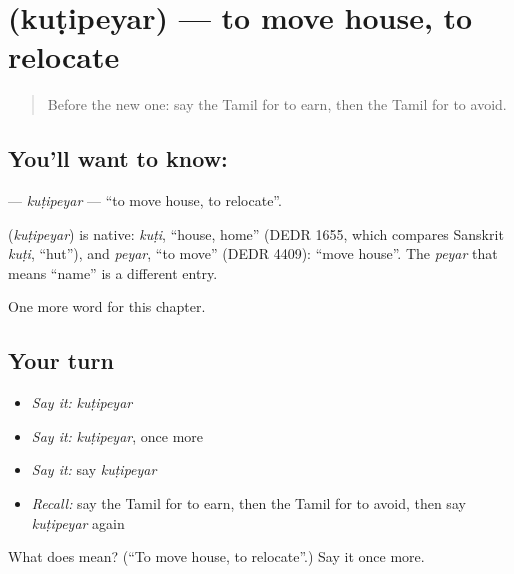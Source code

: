 \section[\texorpdfstring{\ta{குடிபெயர்} (kuṭipeyar)}{குடிபெயர் (kuṭipeyar)}]{ (kuṭipeyar) — to move house, to relocate}

\label{lesson:TA-C197-kutipeyar}



\begin{quote}
Before the new one: say the Tamil for to earn, then the Tamil for to avoid.
\end{quote}

\subsection*{You'll want to know: }
\textbf{} — \emph{kuṭipeyar} — \textquotedblleft{}to move house, to relocate\textquotedblright{}.

\begin{cousinweb}
\textbf{} (\emph{kuṭipeyar}) is native: \emph{kuṭi}, \textquotedblleft{}house, home\textquotedblright{} (DEDR 1655, which compares Sanskrit \emph{kuṭi}, \textquotedblleft{}hut\textquotedblright{}), and \emph{peyar}, \textquotedblleft{}to move\textquotedblright{} (DEDR 4409): \textquotedblleft{}move house\textquotedblright{}. The \emph{peyar} that means \textquotedblleft{}name\textquotedblright{} is a different entry.
\end{cousinweb}

\begin{grammarlens}[title={What you've built}]
One more word for this chapter.
\end{grammarlens}

\subsection*{Your turn}
\begin{itemize}
\raggedright
  \item \emph{Say it:} \emph{kuṭipeyar}
  \item \emph{Say it:} \emph{kuṭipeyar}, once more
  \item \emph{Say it:} say \emph{kuṭipeyar}
  \item \emph{Recall:} say the Tamil for to earn, then the Tamil for to avoid, then say \emph{kuṭipeyar} again
\end{itemize}

\begin{tcolorbox}[breakable,colback=teal!4,colframe=teal!35!black,title={Before you move on}]
What does  mean? (\textquotedblleft{}To move house, to relocate\textquotedblright{}.) Say it once more.
\end{tcolorbox}
